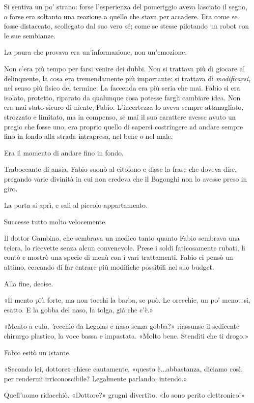 Si sentiva un po' strano: forse l'esperienza del pomeriggio aveva lasciato il segno, o forse era soltanto una reazione a quello che stava per accadere. Era come se fosse distaccato, scollegato dal suo vero sé; come se stesse pilotando un robot con le sue sembianze.

La paura che provava era un'informazione, non un'emozione.

Non c'era più tempo per farsi venire dei dubbi. Non si trattava più di giocare al delinquente, la cosa era tremendamente più importante: si trattava di \emph{modificarsi}, nel senso più fisico del termine. La faccenda era più seria che mai. Fabio si era isolato, protetto, riparato da qualunque cosa potesse fargli cambiare idea. Non era mai stato sicuro di niente, Fabio. L'incertezza lo aveva sempre attanagliato, strozzato e limitato, ma in compenso, se mai il suo carattere avesse avuto un pregio che fosse uno, era proprio quello di sapersi costringere ad andare sempre fino in fondo alla strada intrapresa, nel bene o nel male.

Era il momento di andare fino in fondo.

Traboccante di ansia, Fabio suonò al citofono e disse la frase che doveva dire, pregando varie divinità in cui non credeva che il Bagonghi non lo avesse preso in giro.

La porta si aprì, e salì al piccolo appartamento.

Successe tutto molto velocemente.

Il dottor Gambino, che sembrava un medico tanto quanto Fabio sembrava una teiera, lo ricevette senza alcun convenevole. Prese i soldi faticosamente rubati, li contò e mostrò una specie di menù con i vari trattamenti. Fabio ci pensò un attimo, cercando di far entrare più modifiche possibili nel suo budget.

Alla fine, decise.

«Il mento più forte, ma non tocchi la barba, se può. Le orecchie, un po' meno...sì, esatto. E la gobba del naso, la tolga, già che c'è.»

«Mento a culo, \emph{'}recchie da Legolas e naso senza gobba?» riassunse il sedicente chirurgo plastico, la voce bassa e impastata. «Molto bene. Stenditi che ti drogo.»

Fabio esitò un istante.

«Secondo lei, dottore» chiese cautamente, «questo è...abbastanza, diciamo così, per rendermi irriconoscibile? Legalmente parlando, intendo.»

Quell'uomo ridacchiò. «Dottore?» grugnì divertito. «Io sono perito elettronico!»

